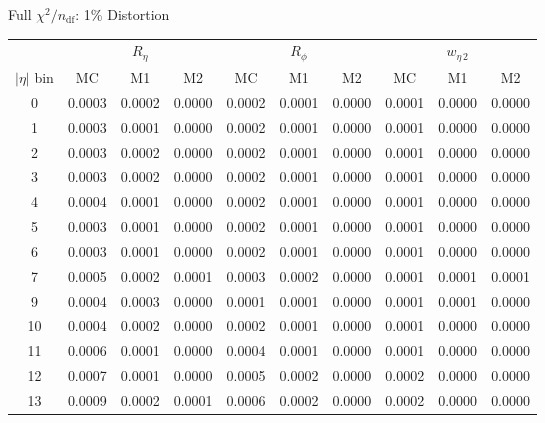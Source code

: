 \documentclass[aspectratio=169,10pt]{beamer}
\begin{document}
\begin{frame}[noframenumbering]{Full $\chi^2/n_\text{df}$: 1\% Distortion}
\centering
\scriptsize
\begin{tabular}{
  c
  c@{\hskip 4pt}c@{\hskip 4pt}c
  c@{\hskip 4pt}c@{\hskip 4pt}c
  c@{\hskip 4pt}c@{\hskip 4pt}c
}
\toprule
& \multicolumn{3}{c}{$R_\eta$}
& \multicolumn{3}{c}{$R_\phi$}
& \multicolumn{3}{c}{$w_{\eta\,2}$} \\
\cmidrule(lr){2-4}\cmidrule(lr){5-7}\cmidrule(lr){8-10}
{$|\eta|$ bin} & {MC} & {M1} & {M2} & {MC} & {M1} & {M2} & {MC} & {M1} & {M2} \\
\midrule
0  & 0.0003 & 0.0002 & 0.0000 & 0.0002 & 0.0001 & 0.0000 & 0.0001 & 0.0000 & 0.0000 \\
1  & 0.0003 & 0.0001 & 0.0000 & 0.0002 & 0.0001 & 0.0000 & 0.0001 & 0.0000 & 0.0000 \\
2  & 0.0003 & 0.0002 & 0.0000 & 0.0002 & 0.0001 & 0.0000 & 0.0001 & 0.0000 & 0.0000 \\
3  & 0.0003 & 0.0002 & 0.0000 & 0.0002 & 0.0001 & 0.0000 & 0.0001 & 0.0000 & 0.0000 \\
4  & 0.0004 & 0.0001 & 0.0000 & 0.0002 & 0.0001 & 0.0000 & 0.0001 & 0.0000 & 0.0000 \\
5  & 0.0003 & 0.0001 & 0.0000 & 0.0002 & 0.0001 & 0.0000 & 0.0001 & 0.0000 & 0.0000 \\
6  & 0.0003 & 0.0001 & 0.0000 & 0.0002 & 0.0001 & 0.0000 & 0.0001 & 0.0000 & 0.0000 \\
7  & 0.0005 & 0.0002 & 0.0001 & 0.0003 & 0.0002 & 0.0000 & 0.0001 & 0.0001 & 0.0001 \\
9  & 0.0004 & 0.0003 & 0.0000 & 0.0001 & 0.0001 & 0.0000 & 0.0001 & 0.0001 & 0.0000 \\
10 & 0.0004 & 0.0002 & 0.0000 & 0.0002 & 0.0001 & 0.0000 & 0.0001 & 0.0000 & 0.0000 \\
11 & 0.0006 & 0.0001 & 0.0000 & 0.0004 & 0.0001 & 0.0000 & 0.0001 & 0.0000 & 0.0000 \\
12 & 0.0007 & 0.0001 & 0.0000 & 0.0005 & 0.0002 & 0.0000 & 0.0002 & 0.0000 & 0.0000 \\
13 & 0.0009 & 0.0002 & 0.0001 & 0.0006 & 0.0002 & 0.0000 & 0.0002 & 0.0000 & 0.0000 \\
\bottomrule
\end{tabular}
\end{frame}
\end{document}
